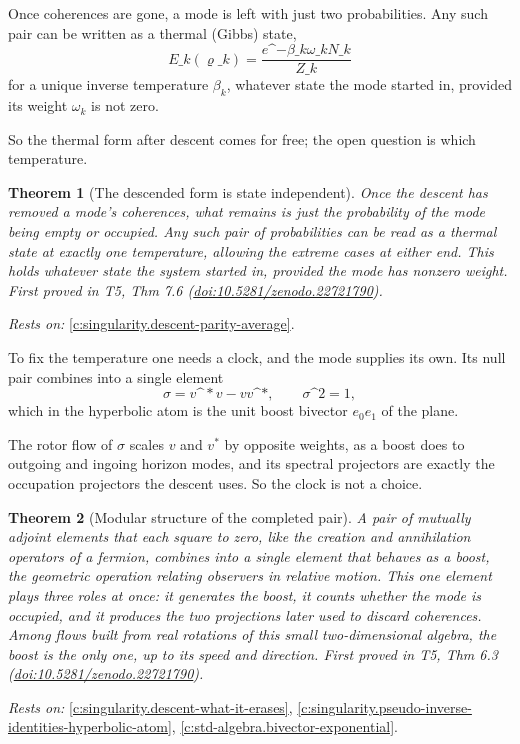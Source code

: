 \documentclass[11pt]{article}
\newtheorem{theorem}{Theorem}[section]
\theoremstyle{definition}
\theoremstyle{plain}
\begin{document}
Once coherences are gone, a mode is left with just two probabilities. Any such pair can be written as a thermal (Gibbs) state, \[ E\_k(\varrho\_k) = \frac{e\^{}{-\beta\_k \omega\_k N\_k}}{Z\_k} \] for a unique inverse temperature $\beta_k$, whatever state the mode started in, provided its weight $\omega_k$ is not zero.

So the thermal form after descent comes for free; the open question is which temperature.

\begin{theorem}[The descended form is state independent]\label{c:singularity.descended-form-state-independent}
Once the descent has removed a mode's coherences, what remains is just the probability of the mode being empty or occupied. Any such pair of probabilities can be read as a thermal state at exactly one temperature, allowing the extreme cases at either end. This holds whatever state the system started in, provided the mode has nonzero weight.
\emph{First proved in} T5, Thm 7.6 (\href{https://doi.org/10.5281/zenodo.22721790}{doi:10.5281/zenodo.22721790}).
\end{theorem}
\noindent\emph{Rests on:} \ref{c:singularity.descent-parity-average}.

To fix the temperature one needs a clock, and the mode supplies its own. Its null pair combines into a single element \[ \sigma = v\^{}* v - v v\^{}* , \qquad \sigma\^{}2 = 1 , \] which in the hyperbolic atom is the unit boost bivector $e_0 e_1$ of the plane.

The rotor flow of $\sigma$ scales $v$ and $v^*$ by opposite weights, as a boost does to outgoing and ingoing horizon modes, and its spectral projectors are exactly the occupation projectors the descent uses. So the clock is not a choice.

\begin{theorem}[Modular structure of the completed pair]\label{c:singularity.modular-structure-completed-pair}
A pair of mutually adjoint elements that each square to zero, like the creation and annihilation operators of a fermion, combines into a single element that behaves as a boost, the geometric operation relating observers in relative motion. This one element plays three roles at once: it generates the boost, it counts whether the mode is occupied, and it produces the two projections later used to discard coherences. Among flows built from real rotations of this small two-dimensional algebra, the boost is the only one, up to its speed and direction.
\emph{First proved in} T5, Thm 6.3 (\href{https://doi.org/10.5281/zenodo.22721790}{doi:10.5281/zenodo.22721790}).
\end{theorem}
\noindent\emph{Rests on:} \ref{c:singularity.descent-what-it-erases}, \ref{c:singularity.pseudo-inverse-identities-hyperbolic-atom}, \ref{c:std-algebra.bivector-exponential}.
\end{document}
